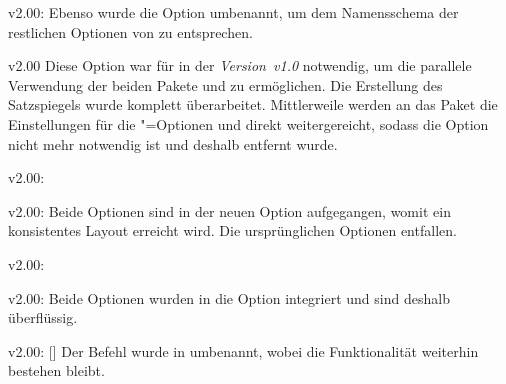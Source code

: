 \begin{Obsolete}{v2.00:}{}
\printobsoletelist%
%
Ebenso wurde die Option  umbenannt, um dem Namensschema der 
restlichen Optionen von \TUDScript zu entsprechen.
\end{Obsolete}

\begin{Obsolete}{v2.00}{}{%
}
\printobsoletelist%
%
Diese Option war für \TUDScript in der \emph{Version~v1.0} notwendig, um die 
parallele Verwendung der beiden Pakete  und 
 zu ermöglichen. Die Erstellung des Satzspiegels wurde 
komplett überarbeitet. Mittlerweile werden an das Paket  die 
Einstellungen für die \KOMAScript"=Optionen  und 
 direkt weitergereicht, sodass die Option 
 nicht mehr notwendig ist und deshalb entfernt wurde.
\end{Obsolete}

\begin{Obsolete}{v2.00:}{%
}
\begin{Obsolete}{v2.00:}{%
}
\printobsoletelist%
%
Beide Optionen sind in der neuen Option  
aufgegangen, womit ein konsistentes Layout erreicht wird. Die ursprünglichen 
Optionen entfallen. 
\end{Obsolete}
\end{Obsolete}

\begin{Obsolete}{v2.00:}{}
\begin{Obsolete}{v2.00:}{}
\printobsoletelist%
%
Beide Optionen wurden in die Option  integriert und sind 
deshalb überflüssig.
\end{Obsolete}
\end{Obsolete}

\begin{Obsolete}{v2.00:}{%
  []%
}
\printobsoletelist%
%
Der Befehl  wurde in  umbenannt, wobei die 
Funktionalität weiterhin bestehen bleibt.
\end{Obsolete}

